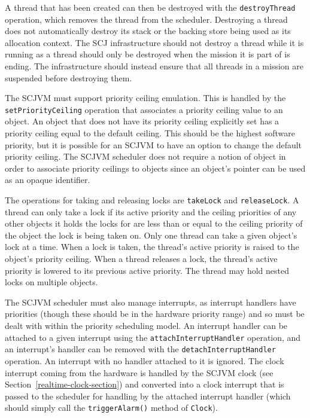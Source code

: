 \documentclass[a4paper,10pt]{report}
\begin{document}
A thread that has been created can then be destroyed with the
\texttt{destroy\-Thread} operation, which removes the thread from the
scheduler.
Destroying a thread does not automatically destroy its stack or the
backing store being used as its allocation context.
The SCJ infrastructure should not destroy a thread while it is running
as a thread should only be destroyed when the mission it is part of is
ending.
The infrastructure should instead ensure that all threads in a mission
are suspended before destroying them.

The SCJVM must support priority ceiling emulation.
This is handled by the \texttt{set\-Priority\-Ceiling} operation that
associates a priority ceiling value to an object.
An object that does not have its priority ceiling explicitly set has a
priority ceiling equal to the default ceiling.
This should be the highest software priority, but it is possible for
an SCJVM to have an option to change the default priority ceiling.
The SCJVM scheduler does not require a notion of object in order to
associate priority ceilings to objects since an object's pointer can
be used as an opaque identifier.

The operations for taking and releasing locks are \texttt{takeLock}
and \texttt{releaseLock}.
A thread can only take a lock if its active priority and the ceiling
priorities of any other objects it holds the locks for are less than
or equal to the ceiling priority of the object the lock is being taken
on.
Only one thread can take a given object's lock at a time.
When a lock is taken, the thread's active priority is raised to the
object's priority ceiling.
When a thread releases a lock, the thread's active priority is lowered
to its previous active priority.
The thread may hold nested locks on multiple objects.

The SCJVM scheduler must also manage interrupts, as interrupt handlers
have priorities (though these should be in the hardware priority
range) and so must be dealt with within the priority scheduling model.
An interrupt handler can be attached to a given interrupt using the
\texttt{attach\-Interrupt\-Handler} operation, and an interrupt's
handler can be removed with the \texttt{detach\-Interrupt\-Handler}
operation.
An interrupt with no handler attached to it is ignored.
The clock interrupt coming from the hardware is handled by the SCJVM
clock (see Section~\ref{realtime-clock-section}) and converted into a
clock interrupt that is passed to the scheduler for handling by the
attached interrupt handler (which should simply call the
\texttt{triggerAlarm()} method of \texttt{Clock}).
\end{document}
